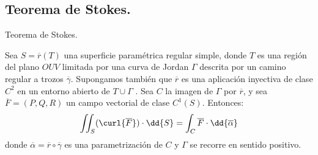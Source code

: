 \subsection{Teorema de Stokes.}
\begin{teo}Teorema de Stokes.

Sea $S = \overline{r}(T)$ una superficie paramétrica regular simple, donde $T$ es una región del plano $OUV$ limitada por una curva de Jordan $\Gamma$  descrita por un camino regular a trozos $\overline{\gamma}$. Supongamos
también que $\overline{r}$ es una aplicación inyectiva de clase $C^{2}$ en un entorno abierto de $T \cup \Gamma$ . Sea $C$ la imagen de $\Gamma$ por $\overline{r}$, y sea $\overline{F} = (P, Q, R)$ un campo vectorial de clase $C^{1} (S)$. Entonces:
\begin{align*}
\iint_{S} (\curl{\overline{F}}) \cdot \dd{S} = \int_{C} \overline{F} \cdot \dd{\overline{\alpha}}
\end{align*}
donde $\overline{\alpha} = \overline{r} \circ \overline{\gamma}$ es una parametrización de $C$ y $\Gamma$ se recorre en sentido positivo.
\end{teo}
